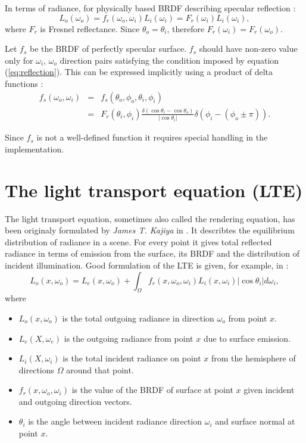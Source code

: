In terms of radiance, for physically based BRDF describing specular reflection \parencite{phar2010}:
\begin{equation}
  L_{o}(\omega_{o}) = f_{r}(\omega_{o}, \omega_{i}) L_{i}(\omega_{i}) = F_{r}(\omega_{i}) L_{i}(\omega_{i}),
\end{equation}
where $F_{r}$ is Fresnel reflectance. Since $\theta_{o} = \theta_{i}$, therefore $F_{r}(\omega_{i}) = F_{r}(\omega_{o})$.

Let $f_{s}$ be the BRDF of perfectly specular surface. $f_{s}$ should have non-zero value only for $\omega_{i}$, $\omega_{o}$ direction pairs satisfying the condition imposed by equation (\ref{eq:reflection}). This can be expressed implicitly using a product of delta functions \parencite{cohen93}:
\begin{eqnarray}
  f_{s}(\omega_{o}, \omega_{i}) &=& f_{s}(\theta_{o}, \phi_{o}, \theta_{i}, \phi_{i}) \nonumber \\
  &=& F_{r}(\theta_{i}, \phi_{i}) \frac{\delta(\cos\theta_{i} - \cos\theta_{o})}{|\cos\theta_{i}|} \delta(\phi_{i} - (\phi_{o} \pm \pi)).
\end{eqnarray}

Since $f_{s}$ is not a well-defined function it requires special handling in the implementation.

\section{The light transport equation (LTE)}
The light transport equation, sometimes also called the rendering equation, has been originaly formulated by \emph{James T. Kajiya} in \cite{kajiya86}. It describtes the equilibrium distribution of radiance in a scene. For every point it gives total reflected radiance in terms of emission from the surface, its BRDF and the distribution of incident illumination. Good formulation of the LTE is given, for example, in \cite{phar2010}:
\begin{equation}
  L_{o}(x, \omega_{o}) = L_{e}(x, \omega_{o}) + \int_{\Omega} f_{r}(x, \omega_{o}, \omega_{i}) L_{i}(x, \omega_{i}) |\cos\theta_{i}| d\omega_{i},
\end{equation}
where
\begin{itemize}
\item $L_{o}(x, \omega_{o})$ is the total outgoing radiance in direction $\omega_{o}$ from point $x$.
\item $L_{e}(X, \omega_{e})$ is the outgoing radiance from point $x$ due to surface emission.
\item $L_{i}(X, \omega_{i})$ is the total incident radiance on point $x$ from the hemisphere of directions $\Omega$ around that point.
\item $f_{r}(x, \omega_{o}, \omega_{i})$ is the value of the BRDF of surface at point $x$ given incident and outgoing direction vectors.
\item $\theta_{i}$ is the angle between incident radiance direction $\omega_{i}$ and surface normal at point $x$.
\end{itemize}

